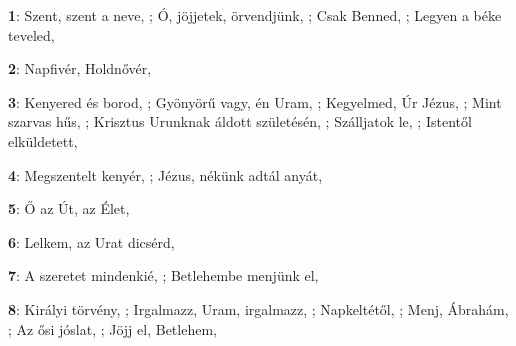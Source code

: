 \begin{minipage}{0.5\textwidth}
\textbf{1}: Szent, szent a neve, \pageref{Szent2Cszentaneve}; Ó, jöjjetek, örvendjünk, \pageref{C3932CjC3B6jjetek2CC3B6rvendjC3BCnk}; Csak Benned, \pageref{CsakBenned}; Legyen a béke teveled, \pageref{LegyenabC3A9keteveled}
\end{minipage}\vspace{0.1cm}
\begin{minipage}{0.5\textwidth}
\textbf{2}: Napfivér, Holdnővér, \pageref{NapfivC3A9r2CHoldnC591vC3A9r}
\end{minipage}\vspace{0.1cm}
\begin{minipage}{0.5\textwidth}
\textbf{3}: Kenyered és borod, \pageref{KenyeredC3A9sborod}; Gyönyörű vagy, én Uram, \pageref{GyC3B6nyC3B6rC5B1vagy2CC3A9nUram}; Kegyelmed, Úr Jézus, \pageref{Kegyelmed2CC39ArJC3A9zus}; Mint szarvas hűs, \pageref{MintszarvashC5B1s}; Krisztus Urunknak áldott születésén, \pageref{KrisztusUrunknakC3A1ldottszC3BCletC3A9sC3A9n}; Szálljatok le, \pageref{SzC3A1lljatokle}; Istentől elküldetett, \pageref{IstentC591lelkC3BCldetett}
\end{minipage}\vspace{0.1cm}
\begin{minipage}{0.5\textwidth}
\textbf{4}: Megszentelt kenyér, \pageref{MegszenteltkenyC3A9r}; Jézus, nékünk adtál anyát, \pageref{JC3A9zus2CnC3A9kC3BCnkadtC3A1lanyC3A1t}
\end{minipage}\vspace{0.1cm}
\begin{minipage}{0.5\textwidth}
\textbf{5}: Ő az Út, az Élet, \pageref{C590azC39At2CazC389let}
\end{minipage}\vspace{0.1cm}
\begin{minipage}{0.5\textwidth}
\textbf{6}: Lelkem, az Urat dicsérd, \pageref{Lelkem2CazUratdicsC3A9rd}
\end{minipage}\vspace{0.1cm}
\begin{minipage}{0.5\textwidth}
\textbf{7}: A szeretet mindenkié, \pageref{AszeretetmindenkiC3A9}; Betlehembe menjünk el, \pageref{BetlehembemenjC3BCnkel}
\end{minipage}\vspace{0.1cm}
\begin{minipage}{0.5\textwidth}
\textbf{8}: Királyi törvény, \pageref{KirC3A1lyitC3B6rvC3A9ny}; Irgalmazz, Uram, irgalmazz, \pageref{Irgalmazz2CUram2Cirgalmazz}; Napkeltétől, \pageref{NapkeltC3A9tC591l}; Menj, Ábrahám, \pageref{Menj2CC381brahC3A1m}; Az ősi jóslat, \pageref{AzC591sijC3B3slat}; Jöjj el, Betlehem, \pageref{JC3B6jjel2CBetlehem}
\end{minipage}\vspace{0.1cm}
